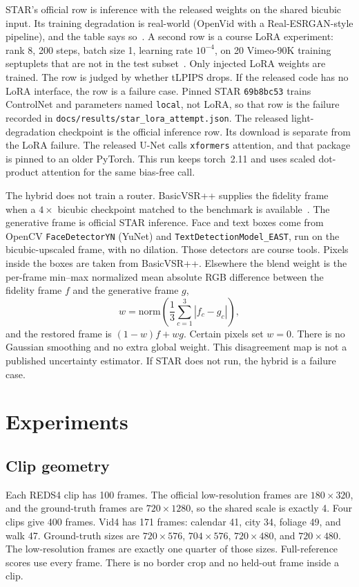 \documentclass[10pt,twocolumn,letterpaper]{article}
\begin{document}
STAR's official row is inference with the released weights on the shared bicubic input.
Its training degradation is real-world (OpenVid with a Real-ESRGAN-style pipeline), and the table says so~\cite{xie2025star}.
A second row is a course LoRA experiment: rank 8, 200 steps, batch size 1, learning rate $10^{-4}$, on 20 Vimeo-90K training septuplets that are not in the test subset~\cite{hu2022lora}.
Only injected LoRA weights are trained.
The row is judged by whether tLPIPS drops.
If the released code has no LoRA interface, the row is a failure case.
Pinned STAR \texttt{69b8bc53} trains ControlNet and parameters named \texttt{local}, not LoRA, so that row is the failure recorded in \texttt{docs/results/star\_lora\_attempt.json}.
The released light-degradation checkpoint is the official inference row. Its download is separate from the LoRA failure.
The released U-Net calls \texttt{xformers} attention, and that package is pinned to an older PyTorch.
This run keeps torch~2.11 and uses scaled dot-product attention for the same bias-free call.

The hybrid does not train a router.
BasicVSR++ supplies the fidelity frame when a $4\times$ bicubic checkpoint matched to the benchmark is available~\cite{chan2022basicvsrpp}.
The generative frame is official STAR inference.
Face and text boxes come from OpenCV \texttt{FaceDetectorYN} (YuNet) and \texttt{TextDetectionModel\_EAST}, run on the bicubic-upscaled frame, with no dilation.
Those detectors are course tools.
Pixels inside the boxes are taken from BasicVSR++.
Elsewhere the blend weight is the per-frame min--max normalized mean absolute RGB difference between the fidelity frame $f$ and the generative frame $g$,
\begin{equation}
w = \mathrm{norm}\!\left(\frac{1}{3}\sum_{c=1}^{3}|f_c-g_c|\right),
\end{equation}
and the restored frame is $(1-w)f + wg$.
Certain pixels set $w=0$.
There is no Gaussian smoothing and no extra global weight.
This disagreement map is not a published uncertainty estimator.
If STAR does not run, the hybrid is a failure case.

\section{Experiments}
\subsection{Clip geometry}
Each REDS4 clip has 100 frames.
The official low-resolution frames are $180\times320$, and the ground-truth frames are $720\times1280$, so the shared scale is exactly 4.
Four clips give 400 frames.
Vid4 has 171 frames: calendar 41, city 34, foliage 49, and walk 47.
Ground-truth sizes are $720\times576$, $704\times576$, $720\times480$, and $720\times480$.
The low-resolution frames are exactly one quarter of those sizes.
Full-reference scores use every frame.
There is no border crop and no held-out frame inside a clip.
\end{document}
